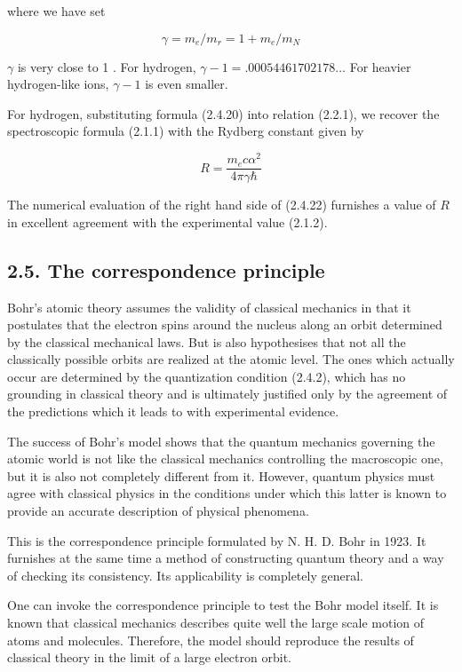 \documentclass{article}
\begin{document}
where we have set
 
\begin{equation*}
\gamma=m_{e} / m_{r}=1+m_{e} / m_{N} \tag{2.4.21}
\end{equation*}
 
$\gamma$ is very close to 1 . For hydrogen, $\gamma-1=.00054461702178 \ldots$ For heavier hydrogen-like ions, $\gamma-1$ is even smaller.

For hydrogen, substituting formula (2.4.20) into relation (2.2.1), we recover the spectroscopic formula (2.1.1) with the Rydberg constant given by
 
\begin{equation*}
R=\frac{m_{e} c \alpha^{2}}{4 \pi \gamma \hbar} \tag{2.4.22}
\end{equation*}
 

The numerical evaluation of the right hand side of (2.4.22) furnishes a value of $R$ in excellent agreement with the experimental value (2.1.2).

\subsection*{2.5. The correspondence principle}

Bohr's atomic theory assumes the validity of classical mechanics in that it postulates that the electron spins around the nucleus along an orbit determined by the classical mechanical laws. But is also hypothesises that not all the classically possible orbits are realized at the atomic level. The ones which actually occur are determined by the quantization condition (2.4.2), which has no grounding in classical theory and is ultimately justified only by the agreement of the predictions which it leads to with experimental evidence.

The success of Bohr's model shows that the quantum mechanics governing the atomic world is not like the classical mechanics controlling the macroscopic one, but it is also not completely different from it. However,
quantum physics must agree with classical physics in the conditions under which this latter is known to provide an accurate description of physical phenomena.

This is the correspondence principle formulated by N. H. D. Bohr in 1923. It furnishes at the same time a method of constructing quantum theory and a way of checking its consistency. Its applicability is completely general.

One can invoke the correspondence principle to test the Bohr model itself. It is known that classical mechanics describes quite well the large scale motion of atoms and molecules. Therefore, the model should reproduce the results of classical theory in the limit of a large electron orbit.
\end{document}
